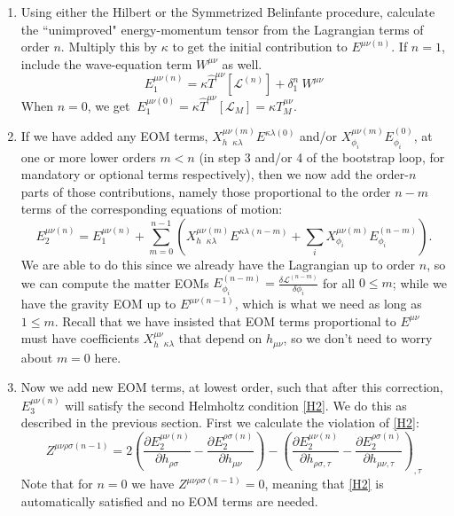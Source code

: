 \documentclass[aps,physrev,preprint,groupedaddress]{revtex4-2}
\begin{document}
\begin{enumerate}
    \item Using either the Hilbert or the Symmetrized Belinfante procedure, calculate the ``unimproved" energy-momentum tensor from the Lagrangian terms of order \(n\). Multiply this by \(\kappa\) to get the initial contribution to \(E^{\mu\nu(n)}\). If \(n=1\), include the wave-equation term \(W^{\mu\nu}\) as well.
    \begin{equation}
    E_1^{\mu\nu(n)}=\kappa\hat{T}^{\mu\nu}[\mathcal{L}^{(n)}]+\delta_1^n\ W^{\mu\nu}
    \end{equation}
    When \(n=0\), we get \(\ E_1^{\mu\nu(0)}=\kappa\hat{T}^{\mu\nu}[\mathcal{L}_M]=\kappa T_M^{\mu\nu}\). 
    \item If we have added any EOM terms, \( X_h^{\mu\nu}{}_{\kappa\lambda}^{(m)}E^{\kappa\lambda(0)}\) and/or \(X_{\phi_i}^{\mu\nu(m)}E_{\phi_i}^{(0)}\), at one or more lower orders \(m<n\)  (in step 3 and/or 4 of the bootstrap loop, for mandatory or optional terms respectively), then we now add the order-\(n\) parts of those contributions, namely those proportional to the order \(n-m\) terms of the corresponding equations of motion:
\begin{equation}
    E_2^{\mu\nu(n)}= E_1^{\mu\nu(n)}+\sum_{m=0}^{n-1} \left(X_h^{\mu\nu}{}_{\kappa\lambda}^{(m)}E^{\kappa\lambda(n-m)}+\sum_i X_{\phi_i}^{\mu\nu(m)}E_{\phi_i}^{(n-m)}\right).
\end{equation}
We are able to do this since we already have the Lagrangian up to order \(n\), so we can compute the matter EOMs \(E_{\phi_i}^{(n-m)}=\frac{\delta\mathcal{L}^{(n-m)}}{\delta\phi_i}\) for all \(0\le m\); while we have the gravity EOM up to \(E^{\mu\nu(n-1)}\), which is what we need as long as \(1\le m\). Recall that we have insisted that EOM terms proportional to \(E^{\mu\nu}\) must have coefficients \(X_h^{\mu\nu}{}_{\kappa\lambda}\) that depend on \(h_{\mu\nu}\), so we don't need to worry about \(m=0\) here.
    \item Now we add new EOM terms, at lowest order, such that after this correction, \(E_3^{\mu\nu(n)}\) will satisfy the second Helmholtz condition \eqref{H2}. We do this as described in the previous section. First we calculate the violation of \eqref{H2}: 
\begin{equation}
    Z^{\mu\nu\rho\sigma(n-1)}=2\left(\frac{\partial E_2^{\mu\nu(n)}}{\partial h_{\rho\sigma}}-\frac{\partial E_2^{\rho\sigma(n)}}{\partial h_{\mu\nu}}\right)-{\left(\frac{\partial E_2^{\mu\nu(n)}}{\partial h_{\rho\sigma,\tau}}-\frac{\partial E_2^{\rho\sigma(n)}}{\partial h_{\mu\nu,\tau}}\right)}_{,\tau}
\end{equation}
Note that for \(n=0\) we have \(Z^{\mu\nu\rho\sigma(n-1)}=0\), meaning that \eqref{H2} is automatically satisfied and no EOM terms are needed.


\end{enumerate}
\end{document}
